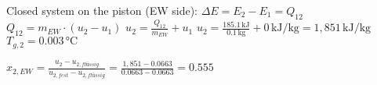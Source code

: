 Closed system on the piston (EW side):  
\( \Delta E = E_2 - E_1 = Q_{12} \)  
\( Q_{12} = m_{EW} \cdot (u_2 - u_1) \)  
\( u_2 = \frac{Q_{12}}{m_{EW}} + u_1 \)  
\( u_2 = \frac{185.1 \, \text{kJ}}{0.1 \, \text{kg}} + 0 \, \text{kJ/kg} = 1,851 \, \text{kJ/kg} \)  
\( T_{g,2} = 0.003 \, \text{°C} \)  

\( x_{2,EW} = \frac{u_2 - u_{2,flüssig}}{u_{2,fest} - u_{2,flüssig}} = \frac{1,851 - 0.0663}{0.0663 - 0.0663} = 0.555 \)
